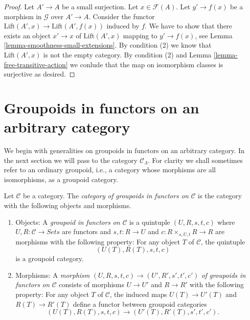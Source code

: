 \begin{proof}
Let $A' \to A$ be a small surjection. Let $x \in \mathcal{F}(A)$.
Let $y' \to f(x)$ be a morphism in $\mathcal{G}$ over $A' \to A$.
Consider the functor $\text{Lift}(A', x) \to \text{Lift}(A', f(x))$
induced by $f$.
We have to show that there exists an object $x' \to x$
of $\text{Lift}(A', x)$ mapping to $y' \to f(x)$, see
Lemma \ref{lemma-smoothness-small-extensions}.
By condition (2) we know that $\text{Lift}(A', x)$
is not the empty category.
By condition (2) and
Lemma \ref{lemma-free-transitive-action}
we conlude that the map on isomorphism classes
is surjective as desired.
\end{proof}






\section{Groupoids in functors on an arbitrary category}
\label{section-groupoids-arbitrary}

\noindent
We begin with generalities on groupoids in functors on an
arbitrary category. In the next section we will
pass to the category $\mathcal{C}_\Lambda$.
For clarity we shall sometimes refer to an ordinary groupoid,
i.e., a category whose morphisms are all isomorphisms, as a groupoid category.

\begin{definition}
\label{definition-groupoid-in-functors}
Let $\mathcal{C}$ be a category. The
{\it category of groupoids in functors on $\mathcal{C}$}
is the category with the following objects and morphisms.
\begin{enumerate}
\item Objects: A {\it groupoid in functors on $\mathcal{C}$} is a quintuple
$(U, R, s, t, c)$ where $U, R : \mathcal{C} \to \textit{Sets}$ are
functors and $s, t : R \to U$ and $c : R \times_{s, U, t} R \to R$
are morphisms with the following property: For any object $T$ of $\mathcal{C}$,
the quintuple
$$
(U(T), R(T), s, t, c)
$$
is a groupoid category.
\item Morphisms: A {\it morphism $(U, R, s, t, c) \to (U', R', s', t', c')$ of
groupoids in functors on $\mathcal{C}$} consists of morphisms $U \to U'$
and $R \to R'$ with the following property: For any object $T$ of
$\mathcal{C}$, the induced maps $U(T) \to U'(T)$ and
$R(T) \to R'(T)$ define a functor between groupoid categories
$$
(U(T), R(T), s, t, c) \to (U'(T), R'(T), s', t', c').
$$
\end{enumerate}
\end{definition}


